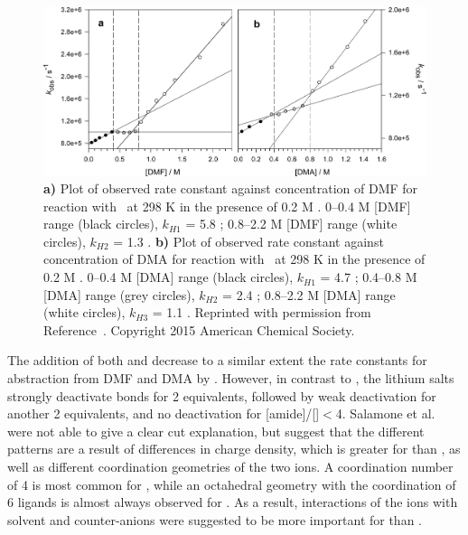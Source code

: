 \begin{doublespace}
\begin{figure}[!htbp]
  \includegraphics[width=\textwidth]{figures/kH-dma-dmf-mgclo42.png}
  \caption[Plot of observed rate constant against concentration of DMF and DMA
  for reaction with \cumo\ at 298 K in the presence of 0.2 M .]
  {\textbf{a)} Plot of observed rate constant against concentration of DMF for
	  reaction with \cumo\ at 298 K in the presence of 0.2 M
	  . 0--0.4 M [DMF] range (black circles), $k_{H1}$ =
	  5.8 \Ms; 0.8--2.2 M [DMF] range (white circles), $k_{H2}$ =
	  1.3 \Ms.  \textbf{b)} Plot of observed rate constant against
  concentration of DMA for reaction with \cumo\ at 298 K in the presence of 0.2
  M . 0--0.4 M [DMA] range (black circles), $k_{H1}$ = 4.7
  \Ms; 0.4--0.8 M [DMA] range (grey circles), $k_{H2}$ = 2.4 \Ms; 0.8--2.2
  M [DMA] range (white circles), $k_{H3}$ = 1.1 \Ms. Reprinted with
  permission from Reference~\protect{}. Copyright
  2015 American Chemical Society.} \label{fig:k-metals-mg}
\end{figure}

The addition of both  and  decrease to a similar extent the
rate constants for abstraction from DMF and DMA by \cumo. However, in contrast
to , the lithium salts strongly deactivate  bonds for 2
equivalents, followed by weak deactivation for another 2 equivalents, and no
deactivation for [amide]/[]$<$4. Salamone et al. were not able to
give a clear cut explanation, but suggest that the different patterns are a
result of differences in charge density, which is greater for  than
, as well as different coordination geometries of the two ions. A
coordination number of 4 is most common for , while an octahedral
geometry with the coordination of 6 ligands is almost always observed for
.\cite{Babu2013, Dudev2014} As a result, interactions of the ions
with solvent and counter-anions were suggested to be more important for
 than .


\end{doublespace}
